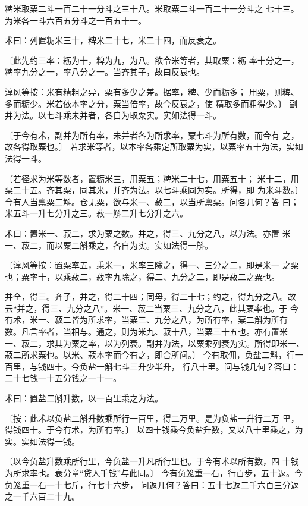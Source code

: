 \documentclass[a4paper,12pt,UTF8,twoside]{ctexbook}
\begin{document}
粺米取粟二斗一百二十一分斗之三十八。米取粟二斗一百二十一分斗之 七十三。为米各一斗六百五分斗之一百五十一。

术曰：列置粝米三十，粺米二十七，米二十四，而反衰之。

〔此先约三率：粝为十，粺为九，为八。欲令米等者，其取粟：粝 率十分之一，粺率九分之一，率八分之一。当齐其子，故曰反衰也。

淳风等按：米有精粗之异，粟有多少之差。据率，粺、少而粝多； 用粟，则粺、多而粝少。米若依本率之分，粟当倍率，故今反衰之，使 精取多而粗得少。〕 副并为法。以七斗乘未并者，各自为取粟实。实如法得一斗。

〔于今有术，副并为所有率，未并者各为所求率，粟七斗为所有数，而今有 之，故各得取粟也。〕 若求米等者，以本率各乘定所取粟为实，以粟率五十为法，实如法得一斗。

〔若径求为米等数者，置粝米三，用粟五；粺米二十七，用粟五十； 米十二，用粟二十五。齐其粟，同其米，并齐为法。以七斗乘同为实。所得，即 为米斗数。〕 今有人当禀粟二斛。仓无粟，欲与米一、菽二，以当所禀粟。问各几何？答 曰；米五斗一升七分升之三。菽一斛二升七分升之六。

术曰：置米一、菽二，求为粟之数。并之，得三、九分之八，以为法。亦置 米一、菽二，而以粟二斛乘之，各自为实。实如法得一斛。

〔淳风等按：置粟率五，乘米一，米率三除之，得一、三分之二，即是米一 之粟也；粟率十，以乘菽二，菽率九除之，得二、九分之二，即是菽二之粟也。

并全，得三。齐子，并之，得二十四；同母，得二十七；约之，得九分之八。故 云“并之，得三、九分之八”。米一、菽二当粟三、九分之八，此其粟率也。于 今有术，米一、菽二皆为所求率，当粟三、九分之八，为所有率，粟二斛为所有 数。凡言率者，当相与。通之，则为米九、菽十八，当粟三十五也。亦有置米 一、菽二，求其为粟之率，以为列衰。副并为法，以粟乘列衰为实。所得即米一、 菽二所求粟也。以米、菽本率而今有之，即合所问。〕 今有取佣，负盐二斛，行一百里，与钱四十。今负盐一斛七斗三升少半升， 行八十里。问与钱几何？答曰：二十七钱一十五分钱之一十一。

术曰：置盐二斛升数，以一百里乘之为法。

〔按：此术以负盐二斛升数乘所行一百里，得二万里。是为负盐一升行二万 里，得钱四十。于今有术，为所有率。〕 以四十钱乘今负盐升数，又以八十里乘之，为实。实如法得一钱。

〔以今负盐升数乘所行里，今负盐一升凡所行里也。于今有术以所有数，四 十钱为所求率也。衰分章“贷人千钱”与此同。〕 今有负笼重一石，行百步，五十返。今负笼重一石一十七斤，行七十六步， 问返几何？答曰：五十七返二千六百三分返之一千六百二十九。
\end{document}
